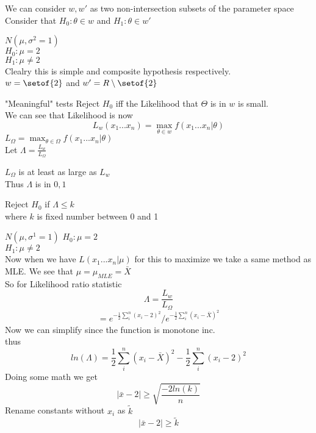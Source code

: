 \documentclass[answers,12pt,addpoints]{exam}
\begin{document}
We can consider $w, w'$ as two non-intersection subsets of the parameter space\\
Consider that $H_0: \theta \in w$ and $H_1: \theta \in w'$\\
\begin{example}
    $N(\mu, \sigma^2 = 1)$\\
    $H_0: \mu = 2$\\
    $H_1: \mu \neq 2$\\
    Clealry this is simple and composite hypothesis respectively.\\
    $w = \setof{2}$ and $w' = R \setminus \setof{2}$\\
\end{example}
"Meaningful" tests Reject $H_0$ iff the Likelihood that $\Theta$ is in $w$ is small.\\
We can see that Likelihood is now 
$$L_w ( x_1 ... x_n) = \max_{\theta \in w} f(x_1 ... x_n | \theta)$$
$L_{\Omega} = \max_{\theta \in \Omega} f(x_1 ... x_n | \theta)$\\
Let $\Lambda = \frac{L_w}{L_{\Omega}}$\\
\begin{remark}
    $L_{\Omega}$ is at least as large as $L_w$\\
    Thus $\Lambda$ is in $0,1$
\end{remark}
\begin{definition}
   Reject $H_0$ if $\Lambda \leq k$\\
   where $k$ is fixed number between 0 and 1\\
\end{definition}
\begin{example}
    $N(\mu, \sigma^1 = 1)$
    $H_0: \mu = 2$\\
    $H_1: \mu \neq 2$\\
    Now when we have $L(x_1 ... x_n | \mu)$ for this to maximize we take a same method as MLE.
    We see that $\mu = \mu_{MLE} = \bar{X}$\\
    So for Likelihood ratio statistic
    $$ \Lambda = \frac{L_w}{L_{\Omega}} $$
    $$ = e^{-\frac{1}{2} \sum_i^n (x_i - 2)^2} / e^{-\frac{1}{2} \sum_i^n (x_i - \bar{X})^2}$$
    Now we can simplify since the function is monotone inc.\\
    thus 
    $$ln(\Lambda) = \frac{1}{2} \sum_i^n (x_i - \bar{X})^2 - \frac{1}{2} \sum_i^n (x_i - 2)^2$$
    Doing some math we get 
    $$ |\bar{x} - 2| \geq  \sqrt{\frac{-2ln(k)}{n}}$$
    Rename constants without $x_i$ as $\tilde{k}$\\
    $$ |\bar{x} - 2| \geq \tilde{k}$$
\end{example}
\end{document}
